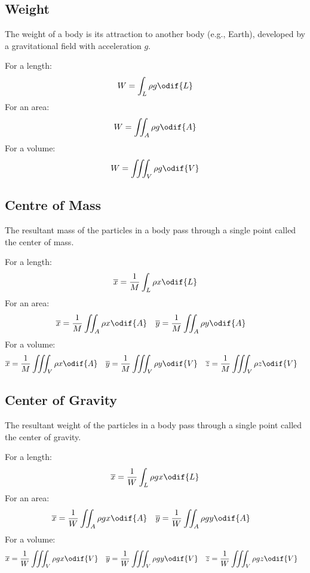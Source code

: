 \documentclass{article}
\begin{document}
\subsection{Weight}
The weight of a body is its attraction to another body (e.g., Earth),
developed by a gravitational field with acceleration \(g\).

For a length:
\begin{equation*}
    W = \int_L \rho g \odif{L}
\end{equation*}
For an area:
\begin{equation*}
    W = \iint_A \rho g \odif{A}
\end{equation*}
For a volume:
\begin{equation*}
    W = \iiint_V \rho g \odif{V}
\end{equation*}
\subsection{Centre of Mass}
The resultant mass of the particles in a body pass through a single point called the center of mass.

For a length:
\begin{equation*}
    \overline{x} = \frac{1}{M} \int_L \rho x \odif{L}
\end{equation*}
For an area:
\begin{align*}
    \overline{x} & = \frac{1}{M} \iint_A \rho x \odif{A} &  & \overline{y} = \frac{1}{M} \iint_A \rho y \odif{A}
\end{align*}
For a volume:
\begin{align*}
    \overline{x} & = \frac{1}{M} \iiint_V \rho x \odif{A} &  & \overline{y} = \frac{1}{M} \iiint_V \rho y \odif{V} &  & \overline{z} = \frac{1}{M} \iiint_V \rho z \odif{V}
\end{align*}
\subsection{Center of Gravity}
The resultant weight of the particles in a body pass through a single point called the center of gravity.

For a length:
\begin{equation*}
    \overline{x} = \frac{1}{W} \int_L \rho g x \odif{L}
\end{equation*}
For an area:
\begin{align*}
    \overline{x} & = \frac{1}{W} \iint_A \rho g x \odif{A} &  & \overline{y} = \frac{1}{W} \iint_A \rho g y \odif{A}
\end{align*}
For a volume:
\begin{align*}
    \overline{x} & = \frac{1}{W} \iiint_V \rho g x \odif{V} &  & \overline{y} = \frac{1}{W} \iiint_V \rho g y \odif{V} &  & \overline{z} = \frac{1}{W} \iiint_V \rho g z \odif{V}
\end{align*}
\end{document}
